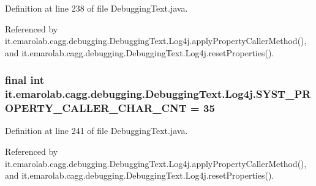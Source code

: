 Definition at line 238 of file Debugging\-Text.\-java.



Referenced by it.\-emarolab.\-cagg.\-debugging.\-Debugging\-Text.\-Log4j.\-apply\-Property\-Caller\-Method(), and it.\-emarolab.\-cagg.\-debugging.\-Debugging\-Text.\-Log4j.\-reset\-Properties().

\hypertarget{classit_1_1emarolab_1_1cagg_1_1debugging_1_1DebuggingText_1_1Log4j_a4d254a48cfd5a977e6bb61f8f821f671}{
\subsubsection[{S\-Y\-S\-T\-\_\-\-P\-R\-O\-P\-E\-R\-T\-Y\-\_\-\-C\-A\-L\-L\-E\-R\-\_\-\-C\-H\-A\-R\-\_\-\-C\-N\-T}]{\setlength{\rightskip}{0pt plus 5cm}final int it.\-emarolab.\-cagg.\-debugging.\-Debugging\-Text.\-Log4j.\-S\-Y\-S\-T\-\_\-\-P\-R\-O\-P\-E\-R\-T\-Y\-\_\-\-C\-A\-L\-L\-E\-R\-\_\-\-C\-H\-A\-R\-\_\-\-C\-N\-T = 35\hspace{0.3cm}{\ttfamily [static]}}}\label{classit_1_1emarolab_1_1cagg_1_1debugging_1_1DebuggingText_1_1Log4j_a4d254a48cfd5a977e6bb61f8f821f671}


Definition at line 241 of file Debugging\-Text.\-java.



Referenced by it.\-emarolab.\-cagg.\-debugging.\-Debugging\-Text.\-Log4j.\-apply\-Property\-Caller\-Method(), and it.\-emarolab.\-cagg.\-debugging.\-Debugging\-Text.\-Log4j.\-reset\-Properties().

